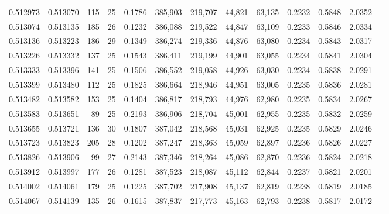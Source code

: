 \begin{tabular}{rrrrrrrrrrrrr}
0.512973 & 0.513070 & 115 &  25 &                                     0.1786 & 385,903 & 219,707 &  44,821 &  63,135 & 0.2232 & 0.5848 & 2.0352 \\
0.513074 & 0.513135 & 185 &  26 &                                     0.1232 & 386,088 & 219,522 &  44,847 &  63,109 & 0.2233 & 0.5846 & 2.0334 \\
0.513136 & 0.513223 & 186 &  29 &                                     0.1349 & 386,274 & 219,336 &  44,876 &  63,080 & 0.2234 & 0.5843 & 2.0317 \\
0.513226 & 0.513332 & 137 &  25 &                                     0.1543 & 386,411 & 219,199 &  44,901 &  63,055 & 0.2234 & 0.5841 & 2.0304 \\
0.513333 & 0.513396 & 141 &  25 &                                     0.1506 & 386,552 & 219,058 &  44,926 &  63,030 & 0.2234 & 0.5838 & 2.0291 \\
0.513399 & 0.513480 & 112 &  25 &                                     0.1825 & 386,664 & 218,946 &  44,951 &  63,005 & 0.2235 & 0.5836 & 2.0281 \\
0.513482 & 0.513582 & 153 &  25 &                                     0.1404 & 386,817 & 218,793 &  44,976 &  62,980 & 0.2235 & 0.5834 & 2.0267 \\
0.513583 & 0.513651 &  89 &  25 &                                     0.2193 & 386,906 & 218,704 &  45,001 &  62,955 & 0.2235 & 0.5832 & 2.0259 \\
0.513655 & 0.513721 & 136 &  30 &                                     0.1807 & 387,042 & 218,568 &  45,031 &  62,925 & 0.2235 & 0.5829 & 2.0246 \\
0.513723 & 0.513823 & 205 &  28 &                                     0.1202 & 387,247 & 218,363 &  45,059 &  62,897 & 0.2236 & 0.5826 & 2.0227 \\
0.513826 & 0.513906 &  99 &  27 &                                     0.2143 & 387,346 & 218,264 &  45,086 &  62,870 & 0.2236 & 0.5824 & 2.0218 \\
0.513912 & 0.513997 & 177 &  26 &                                     0.1281 & 387,523 & 218,087 &  45,112 &  62,844 & 0.2237 & 0.5821 & 2.0201 \\
0.514002 & 0.514061 & 179 &  25 &                                     0.1225 & 387,702 & 217,908 &  45,137 &  62,819 & 0.2238 & 0.5819 & 2.0185 \\
0.514067 & 0.514139 & 135 &  26 &                                     0.1615 & 387,837 & 217,773 &  45,163 &  62,793 & 0.2238 & 0.5817 & 2.0172 \\

\end{tabular}
